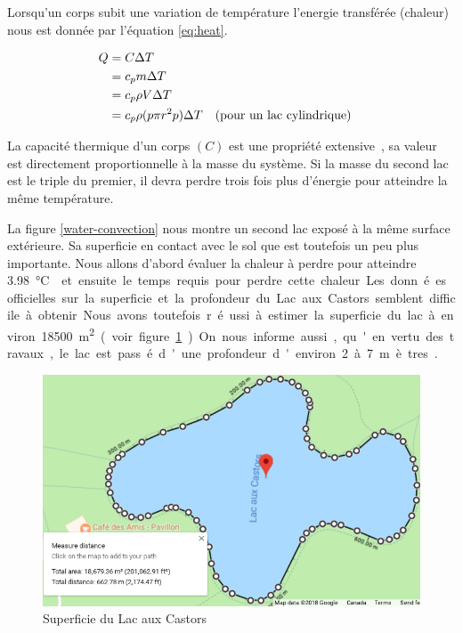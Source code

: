 \documentclass[12pt]{article}
\newcommand\critical{\SI{3.98}\celsius}
\numberwithin{figure}{section}
\numberwithin{table}{section}
\begin{document}
Lorsqu'un corps subit une variation de temp\'erature l'energie transf\'er\'ee
(chaleur)~\cite{Q-equation} nous est donn\'ee par l'\'equation \eqref{eq:heat}.

\begin{align}
    Q &= C\Delta T\label{eq:heat}\\
    &= c_pm\Delta T\notag\\
    &= c_p\rho V\Delta T\notag\\
    &= c_p\rho (p\pi r^2p)\Delta T &&\text{(pour un lac cylindrique)}\notag
\end{align}

La capacit\'e thermique d'un corps $(C)$ est une propri\'et\'e extensive~\cite{Extensive}, sa valeur
est directement proportionnelle \`a la masse du syst\`eme. Si la masse du second lac est le triple
du premier, il devra perdre trois fois plus d'\'energie pour atteindre la m\^eme temp\'erature.

La figure \ref{water-convection} nous montre un second lac expos\'e \`a la m\^eme surface
ext\'erieure. Sa superficie en contact avec le sol que est toutefois un peu plus importante. Nous
allons d'abord \'evaluer la chaleur \`a perdre pour atteindre \critical{} et ensuite le temps requis
pour perdre cette chaleur.

Les donn\'ees officielles sur la superficie et la profondeur du Lac aux Castors semblent difficile
\`a obtenir. Nous avons toutefois r\'eussi \`a estimer la superficie du lac \`a environ
\SI{18500}{\square\meter} (voir figure \ref{google-castor}). On nous informe aussi, qu'en vertu des
travaux, le lac est pass\'e d'une profondeur d'environ 2 \`a 7 m\`etres~\cite{Lac-Castor}.

\begin{figure}[h]
    \centering
    \includegraphics[scale=0.5]{Superficie.png}
    \caption{Superficie du Lac aux Castors}\label{google-castor}
\end{figure}
\end{document}
